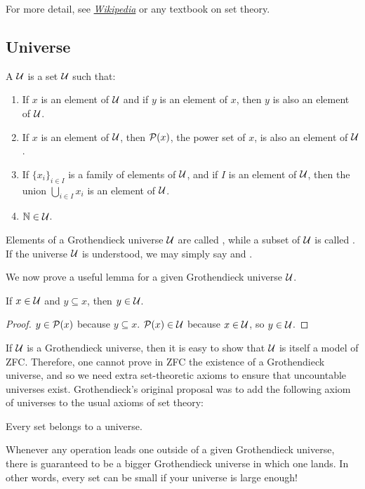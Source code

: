   For more detail, see \href{http://en.wikipedia.org/wiki/Zermelo-Fraenkel_set_theory}{\emph{Wikipedia}} or any textbook on set theory.

\subsection{Universe}
  \begin{defn}
    A  ${\cal U}$ is a set ${\cal U}$ such that:
    \begin{enumerate}
      \item If $x$ is an element of ${\cal U}$ and if $y$ is an element of $x$, then $y$ is also an element of ${\cal U}$.
      \item If $x$ is an element of ${\cal U}$, then ${\cal P}(x)$, the power set of $x$, is also an element of ${\cal U}$.
      \item If $\{x_i\}_{i\in I}$ is a family of elements of ${\cal U}$, and if $I$ is an element of ${\cal U}$, then the union $\bigcup_{i\in I} x_i$ is an element of ${\cal U}$.
      \item $\operatorname{\mathbb{N}}\in{\cal U}$.
    \end{enumerate}

    Elements of a Grothendieck universe ${\cal U}$ are called , while a subset of ${\cal U}$ is called .  If the universe ${\cal U}$ is understood, we may simply say  and .
  \end{defn}
  We now prove a useful lemma for a given Grothendieck universe ${\cal U}$.
  \begin{lem}
    If $x \in {\cal U}$ and $y \subseteq x$, then $y \in {\cal U}$.
  \end{lem}
  \begin{proof}
    $y \in {\cal P}(x)$ because $y \subseteq x$. ${\cal P}(x) \in {\cal U}$ because $x \in {\cal U}$, so $y \in {\cal U}$.
  \end{proof}
  If ${\cal U}$ is a Grothendieck universe, then it is easy to show that ${\cal U}$ is itself a model of ZFC. Therefore, one cannot prove in ZFC the existence of a Grothendieck universe, and so we need extra set-theoretic axioms to ensure that uncountable universes exist. Grothendieck's original proposal was to add the following axiom of universes to the usual axioms of set theory:
  \begin{axiom}[Universes]
    Every set belongs to a universe.
  \end{axiom}
  Whenever any operation leads one outside of a given Grothendieck universe, there is guaranteed to be a bigger Grothendieck universe in which one lands. In other words, every set can be small if your universe is large enough!

